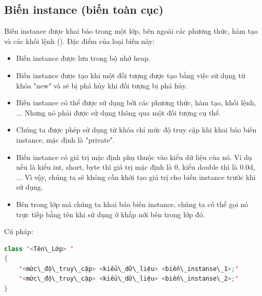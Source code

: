 \subsection{Biến instance (biến toàn cục)}
\indent Biến instance được khai báo trong một lớp, bên ngoài các phương thức, hàm tạo và các khối lệnh ({}). Đặc điểm của loại biến này:\\
\begin{itemize}
\item Biến instance được lưu trong bộ nhớ heap.
\item Biến instance được tạo khi một đối tượng được tạo bằng việc sử dụng từ khóa {\ttfamily "new"} và sẽ bị phá hủy khi đối tượng bị phá hủy.
\item Biến instance có thể được sử dụng bởi các phương thức, hàm tạo, khối lệnh, ... Nhưng nó phải được sử dụng thông qua một đối tượng cụ thể.
\item Chúng ta được phép sử dụng từ khóa chỉ mức độ truy cập khi khai báo biến instance, mặc định là "private".
\item Biến instance có giá trị mặc định phụ thuộc vào kiểu dữ liệu của nó. Ví dụ nếu là kiểu {\ttfamily int, short, byte} thì giá trị mặc định là 0, kiểu {\ttfamily double} thì là {\ttfamily 0.0d}, ... Vì vậy, chúng ta sẽ không cần khởi tạo giá trị cho biến instance trước khi sử dụng.
\item Bên trong lớp mà chúng ta khai báo biến instance, chúng ta có thể gọi nó trực tiếp bằng tên khi sử dụng ở khắp nới bên trong lớp đó.
\end{itemize}
\indent Cú pháp:
\begin{lstlisting}[escapechar=',language=java]	
class '<Tên\_Lớp> '
{ 
	'<mức\_độ\_truy\_cập> <kiểu\_dữ\_liệu> <biến\_instanse\_1>;'
	'<mức\_độ\_truy\_cập> <kiểu\_dữ\_liệu> <biến\_instanse\_2>;'
}
\end{lstlisting}


